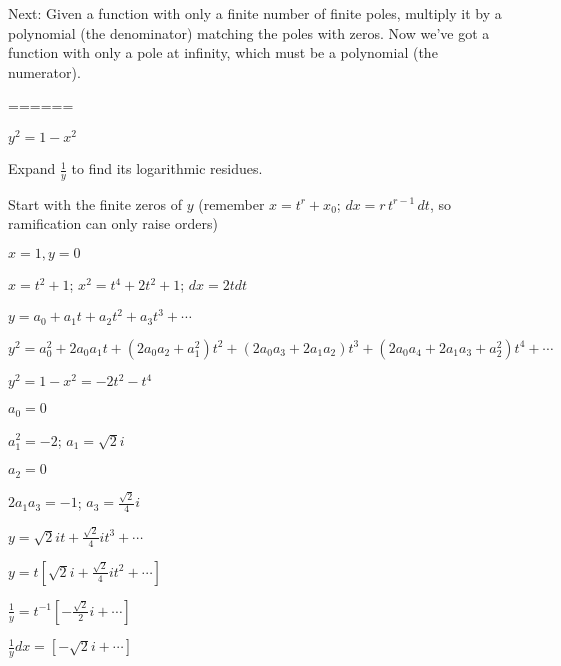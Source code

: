 Next: Given a function with only a finite number of finite poles,
multiply it by a polynomial (the denominator) matching the poles with
zeros.  Now we've got a function with only a pole at infinity, which
must be a polynomial (the numerator).

======

$y^2 = 1 - x^2$

Expand $\frac{1}{y}$ to find its logarithmic residues.

Start with the finite zeros of $y$ (remember $x=t^r+x_0$; $dx=r\,
t^{r-1}\, dt$, so ramification can only raise orders)

$x=1, y=0$

$x=t^2+1$; $x^2=t^4+2t^2+1$; $dx = 2 t dt$

$y=a_0 + a_1 t + a_2 t^2 + a_3 t^3 + \cdots$

$y^2 = a_0^2 + 2 a_0 a_1 t + (2 a_0 a_2 + a_1^2) t^2 + (2 a_0 a_3 + 2 a_1 a_2) t^3 + (2 a_0 a_4 + 2 a_1 a_3 + a_2^2) t^4 + \cdots$

$y^2 = 1 - x^2 = -2t^2 - t^4$

$a_0=0$

$a_1^2 = -2$; $a_1 = \sqrt{2}i$

$a_2 = 0$

$2 a_1 a_3 = -1$; $a_3 = \frac{\sqrt{2}}{4} i$

$y = \sqrt{2}it + \frac{\sqrt{2}}{4} it^3 + \cdots$

$y = t \left[ \sqrt{2}i + \frac{\sqrt{2}}{4} it^2 + \cdots \right]$

$\frac{1}{y} = t^{-1} \left[ -\frac{\sqrt{2}}{2}i + \cdots \right]$

$\frac{1}{y} dx = \left[ -\sqrt{2}i + \cdots \right] $
